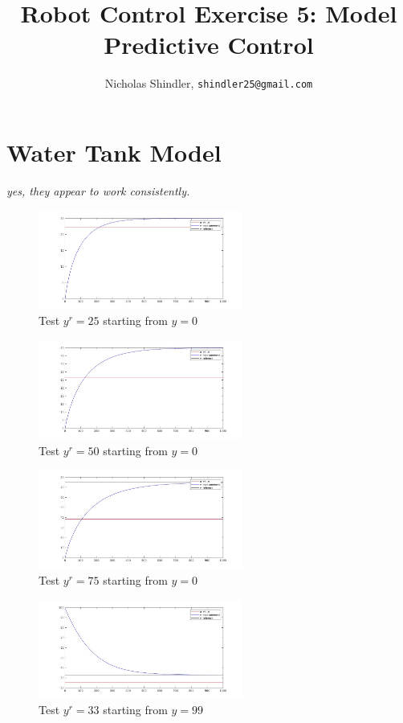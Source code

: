 \documentclass{article}
\title{Robot Control Exercise 5: Model Predictive Control}
\author{Nicholas Shindler, \texttt{shindler25@gmail.com}}
\begin{document}
\maketitle

\section{Water Tank Model}

\textit{yes, they appear to work consistently.}

\begin{figure}[H]
    \centering
    \includegraphics[width=0.6\textwidth]{wt_model_0_25.jpg}
    \caption{Test $y^r = 25$ starting from $y=0$}
    \label{fig:yr25}
\end{figure}
\begin{figure}[H]
    \centering
    \includegraphics[width=0.6\textwidth]{wt_model_0_50.jpg}
    \caption{Test $y^r = 50$ starting from $y=0$}
    \label{fig:yr50}
\end{figure}
\begin{figure}[H]
    \centering
    \includegraphics[width=0.6\textwidth]{wt_model_0_75.jpg}
    \caption{Test $y^r = 75$ starting from $y=0$}
    \label{fig:yr75}
\end{figure}


\begin{figure}[H]
    \centering
    \includegraphics[width=0.6\textwidth]{wt_model_99_33.jpg}
    \caption{Test $y^r = 33$ starting from $y=99$}
    \label{fig:yisyr}
\end{figure}
\end{document}
